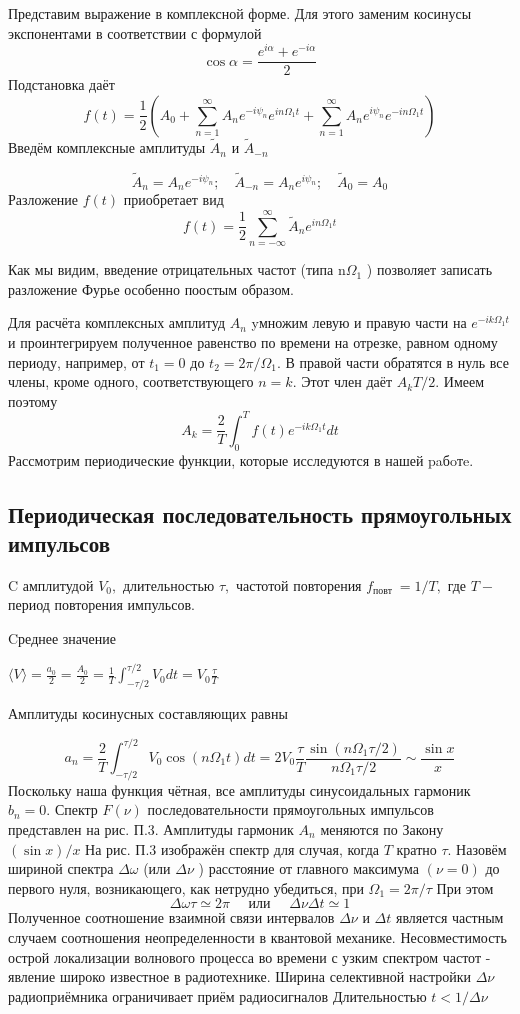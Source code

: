\documentclass[a4paper, 12pt]{article}%
\begin{document}
Представим выражение в комплексной форме. Для этого заменим косинусы экспонентами в соответствии с формулой
$$
\cos \alpha=\frac{e^{i \alpha}+e^{-i \alpha}}{2}
$$
Подстановка даёт
$$
f(t)=\frac{1}{2}\left(A_{0}+\sum_{n=1}^{\infty} A_{n} e^{-i \psi_{n}} e^{i n \Omega_{1} t}+\sum_{n=1}^{\infty} A_{n} e^{i \psi_{n}} e^{-i n \Omega_{1} t}\right)
$$
Введём комплексные амплитуды $\tilde{A}_{n}$ и $\tilde{A}_{-n}$

$$
\tilde{A}_{n}=A_{n} e^{-i \psi_{n}} ; \quad \tilde{A}_{-n}=A_{n} e^{i \psi_{n}} ; \quad \tilde{A}_{0}=A_{0}
$$
Разложение $f(t)$ приобретает вид
$$
f(t)=\frac{1}{2} \sum_{n=-\infty}^{\infty} \tilde{A}_{n} e^{i n \Omega_{1} t}
$$

Как мы видим, введение отрицательных частот (типа $\mathrm{n} \Omega_{1}$ ) позволяет записать разложение Фурье особенно поостым образом.

Для расчёта комплексных амплитуд $A_{n}$ yмножим левую и правую части на $e^{-i k \Omega_{1} t}$ и проинтегрируем полученное равенство по времени на отрезке, равном одному периоду, например, от $t_{1}=0$ до $t_{2}=2 \pi / \Omega_{1} .$ В правой части обратятся в нуль все члены, кроме одного, соответствующего $n=k .$ Этот член даёт $A_{k} T / 2 .$ Имеем поэтому
$$
A_{k}=\frac{2}{T} \int_{0}^{T} f(t) e^{-i k \Omega_{1} t} d t
$$
Рассмотрим периодические функции, которые исследуются в нашей paбoтe.


\subsection{Периодическая последовательность прямоугольных импульсов}
C амплитудой $V_{0},$ длительностью $\tau,$ частотой повторения $f_{\text {повт }}=1 / T,$ где $T-$ период повторения импульсов.


Cреднее значение

$\langle V\rangle=\frac{a_{0}}{2}=\frac{A_{0}}{2}=\frac{1}{T} \int_{-\tau / 2}^{\tau / 2} V_{0} d t=V_{0} \frac{\tau}{T}$

Амплитуды косинусных составляющих равны

$$
a_{n}=\frac{2}{T} \int_{-\tau / 2}^{\tau / 2} V_{0} \cos \left(n \Omega_{1} t\right) d t=2 V_{0} \frac{\tau}{T} \frac{\sin \left(n \Omega_{1} \tau / 2\right)}{n \Omega_{1} \tau / 2} \sim \frac{\sin x}{x}
$$
Поскольку наша функция чётная, все амплитуды синусоидальных гармоник $b_{n}=0 .$ Спектр $F(\nu)$ последовательности прямоугольных импульсов представлен на рис. П.3. Амплитуды гармоник $A_{n}$ меняются по Закону $(\sin x) / x$
На рис. П.3 изображён спектр для случая, когда $T$ кратно $\tau .$ Назовём шириной спектра $\Delta \omega$ (или $\Delta \nu$ ) расстояние от главного максимума $(\nu=0)$ до первого нуля, возникающего, как нетрудно убедиться, при $\Omega_{1}=2 \pi / \tau$ При этом
$$
\Delta \omega \tau \simeq 2 \pi \quad \text { или } \quad \Delta \nu \Delta t \simeq 1
$$
Полученное соотношение взаимной связи интервалов $\Delta \nu$ и $\Delta t$ является
частным случаем соотношения неопределенности в квантовой механике. Несовместимость острой локализации волнового процесса во времени с узким спектром частот - явление широко известное в радиотехнике. Ширина селективной настройки $\Delta \nu$ радиоприёмника ограничивает приём радиосигналов Длительностью $t<1 / \Delta \nu$
\end{document}
